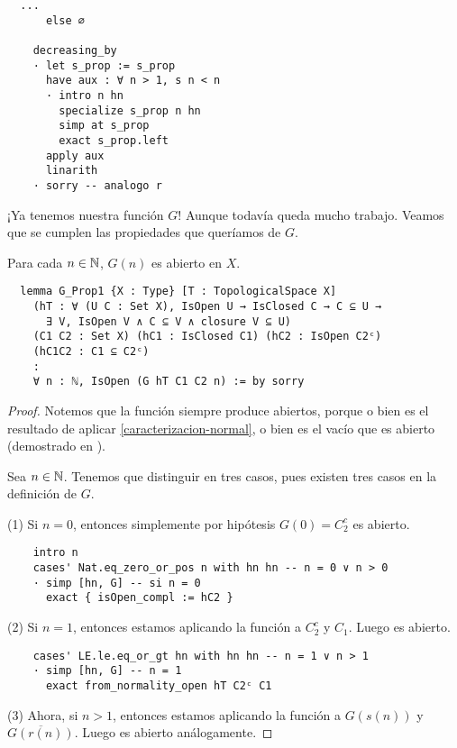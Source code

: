 \begin{lstlisting}
  ...
      else ∅

    decreasing_by
    · let s_prop := s_prop
      have aux : ∀ n > 1, s n < n
      · intro n hn
        specialize s_prop n hn
        simp at s_prop
        exact s_prop.left
      apply aux
      linarith
    · sorry -- analogo r
\end{lstlisting}

¡Ya tenemos nuestra función $G$! Aunque todavía queda mucho trabajo. Veamos que se cumplen las propiedades que queríamos de $G$.

\begin{lemma}\label{prop:G-open}
  Para cada $n \in \mathbb{N}$, $G(n)$ es abierto en $X$.
\end{lemma}

\begin{lstlisting}
  lemma G_Prop1 {X : Type} [T : TopologicalSpace X]
    (hT : ∀ (U C : Set X), IsOpen U → IsClosed C → C ⊆ U →
      ∃ V, IsOpen V ∧ C ⊆ V ∧ closure V ⊆ U)
    (C1 C2 : Set X) (hC1 : IsClosed C1) (hC2 : IsOpen C2ᶜ)
    (hC1C2 : C1 ⊆ C2ᶜ)
    :
    ∀ n : ℕ, IsOpen (G hT C1 C2 n) := by sorry
\end{lstlisting}

\begin{proof}
  Notemos que la función  siempre produce abiertos, porque o bien es el resultado de aplicar \ref{caracterizacion-normal}, o bien es el vacío que es abierto (demostrado en ).

  Sea $n \in \mathbb{N}$. Tenemos que distinguir en tres casos, pues existen tres casos en la definición de $G$.

  (1) Si $n = 0$, entonces simplemente por hipótesis $G(0) = C_2^c$ es abierto.

  \begin{lstlisting}
    intro n
    cases' Nat.eq_zero_or_pos n with hn hn -- n = 0 ∨ n > 0
    · simp [hn, G] -- si n = 0
      exact { isOpen_compl := hC2 }
  \end{lstlisting}

  (2) Si $n = 1$, entonces estamos aplicando la función  a $C_2^c$ y $C_1$. Luego es abierto.

  \begin{lstlisting}
    cases' LE.le.eq_or_gt hn with hn hn -- n = 1 ∨ n > 1
    · simp [hn, G] -- n = 1
      exact from_normality_open hT C2ᶜ C1 \end{lstlisting}

  (3) Ahora, si $n > 1$, entonces estamos aplicando la función  a $G(s(n))$ y $\overline{G(r(n))}$. Luego es abierto análogamente.
\end{proof}


